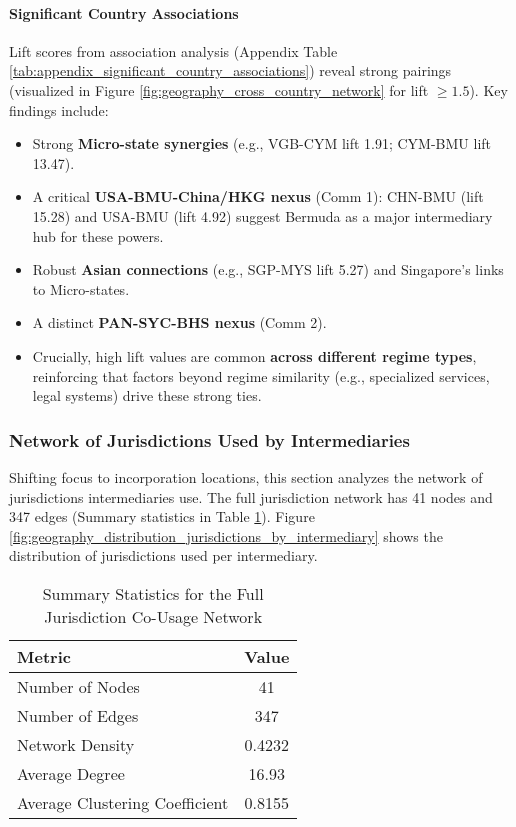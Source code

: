 \paragraph{Significant Country Associations}
Lift scores from association analysis (Appendix Table \ref{tab:appendix_significant_country_associations}) reveal strong pairings (visualized in Figure \ref{fig:geography_cross_country_network} for lift $\ge 1.5$).
Key findings include:
\begin{itemize}
    \item Strong \textbf{Micro-state synergies} (e.g., VGB-CYM lift 1.91; CYM-BMU lift 13.47).
    \item A critical \textbf{USA-BMU-China/HKG nexus} (Comm 1): CHN-BMU (lift 15.28) and USA-BMU (lift 4.92) suggest Bermuda as a major intermediary hub for these powers.
    \item Robust \textbf{Asian connections} (e.g., SGP-MYS lift 5.27) and Singapore's links to Micro-states.
    \item A distinct \textbf{PAN-SYC-BHS nexus} (Comm 2).
    \item Crucially, high lift values are common \textbf{across different regime types}, reinforcing that factors beyond regime similarity (e.g., specialized services, legal systems) drive these strong ties.
\end{itemize}

\subsubsection{Network of Jurisdictions Used by Intermediaries}
Shifting focus to incorporation locations, this section analyzes the network of jurisdictions intermediaries use. The full jurisdiction network has 41 nodes and 347 edges (Summary statistics in Table \ref{tab:jurisdiction_network_summary}). Figure \ref{fig:geography_distribution_jurisdictions_by_intermediary} shows the distribution of jurisdictions used per intermediary.

\begin{table}[htbp]
\centering
\caption{Summary Statistics for the Full Jurisdiction Co-Usage Network}
\label{tab:jurisdiction_network_summary}
\begin{tabular}{lc}
\toprule
Metric                        & Value    \\
\midrule
Number of Nodes               & 41       \\
Number of Edges               & 347      \\
Network Density               & 0.4232   \\
Average Degree                & 16.93    \\
Average Clustering Coefficient & 0.8155   \\
\bottomrule
\end{tabular}
\end{table}

